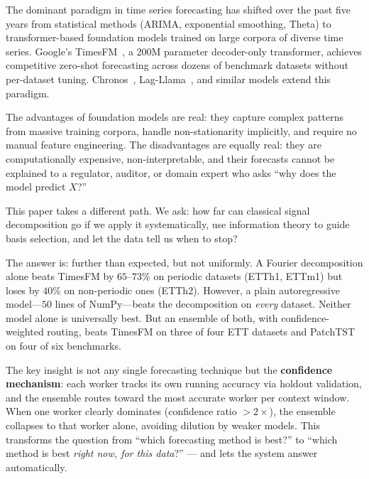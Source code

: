 \documentclass[sigconf,nonacm]{acmart}
\begin{document}
The dominant paradigm in time series forecasting has shifted over the past five years from statistical methods (ARIMA, exponential smoothing, Theta) to transformer-based foundation models trained on large corpora of diverse time series. Google's TimesFM~\cite{das2024}, a $200$M parameter decoder-only transformer, achieves competitive zero-shot forecasting across dozens of benchmark datasets without per-dataset tuning. Chronos~\cite{ansari2024}, Lag-Llama~\cite{rasul2023}, and similar models extend this paradigm.

The advantages of foundation models are real: they capture complex patterns from massive training corpora, handle non-stationarity implicitly, and require no manual feature engineering. The disadvantages are equally real: they are computationally expensive, non-interpretable, and their forecasts cannot be explained to a regulator, auditor, or domain expert who asks ``why does the model predict $X$?''

This paper takes a different path. We ask: how far can classical signal decomposition go if we apply it systematically, use information theory to guide basis selection, and let the data tell us when to stop?

The answer is: further than expected, but not uniformly. A Fourier decomposition alone beats TimesFM by $65$--$73\%$ on periodic datasets (ETTh1, ETTm1) but loses by $40\%$ on non-periodic ones (ETTh2). However, a plain autoregressive model---$50$ lines of NumPy---beats the decomposition on \emph{every} dataset. Neither model alone is universally best. But an ensemble of both, with confidence-weighted routing, beats TimesFM on three of four ETT datasets and PatchTST on four of six benchmarks.

The key insight is not any single forecasting technique but the \textbf{confidence mechanism}: each worker tracks its own running accuracy via holdout validation, and the ensemble routes toward the most accurate worker per context window. When one worker clearly dominates (confidence ratio $> 2\times$), the ensemble collapses to that worker alone, avoiding dilution by weaker models. This transforms the question from ``which forecasting method is best?'' to ``which method is best \emph{right now, for this data}?'' --- and lets the system answer automatically.
\end{document}
